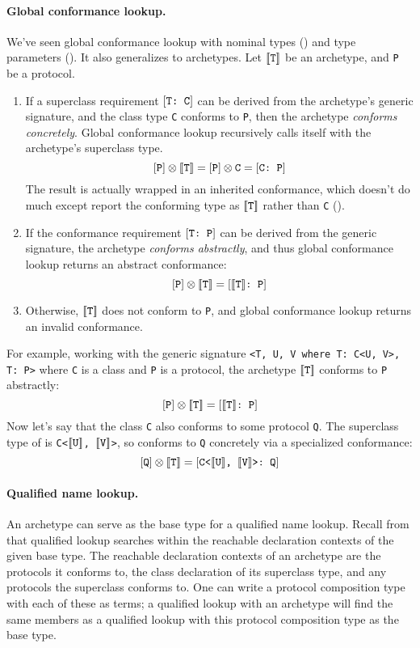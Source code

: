 \documentclass[../generics]{subfiles}
\begin{document}
\paragraph{Global conformance lookup.} We've seen global conformance lookup with nominal types () and type parameters (). It also generalizes to archetypes. Let $[\![\texttt{T}]\!]$ be an archetype, and \texttt{P} be a protocol.
\begin{enumerate}
\item If a superclass requirement $[\texttt{T:~C}]$ can be derived from the archetype's generic signature, and the class type \texttt{C} conforms to \texttt{P}, then the archetype \emph{conforms concretely}. Global conformance lookup recursively calls itself with the archetype's superclass type.
\[[\texttt{P}]\otimes[\![\texttt{T}]\!]=[\texttt{P}]\otimes\texttt{C}=[\texttt{C:~P}]\]
The result is actually wrapped in an inherited conformance, which doesn't do much except report the conforming type as $[\![\texttt{T}]\!]$ rather than \texttt{C} ().
\item If the conformance requirement $[\texttt{T:~P}]$ can be derived from the generic signature, the archetype \emph{conforms abstractly}, and thus global conformance lookup returns an abstract conformance:
\[[\texttt{P}]\otimes[\![\texttt{T}]\!]=[\texttt{$[\![\texttt{T}]\!]$:~P}]\]
\item Otherwise, $[\![\texttt{T}]\!]$ does not conform to \texttt{P}, and global conformance lookup returns an invalid conformance.
\end{enumerate}
For example, working with the generic signature \verb|<T, U, V where T: C<U, V>, T: P>| where \texttt{C} is a class and \texttt{P} is a protocol, the archetype $[\![\texttt{T}]\!]$ conforms to \texttt{P} abstractly:
\[
[\texttt{P}]\otimes [\![\texttt{T}]\!] = [\texttt{$[\![\texttt{T}]\!]$:~P}]
\]
Now let's say that the class \texttt{C} also conforms to some protocol \texttt{Q}. The superclass type of  is \texttt{C<$[\![\texttt{U}]\!]$, $[\![\texttt{V}]\!]$>}, so  conforms to \texttt{Q} concretely via a specialized conformance:
\[
[\texttt{Q}]\otimes [\![\texttt{T}]\!] = [\texttt{C<$[\![\texttt{U}]\!]$, $[\![\texttt{V}]\!]$>:~Q}]
\]

\paragraph{Qualified name lookup.} An archetype can serve as the base type for a qualified name lookup. Recall from  that qualified lookup searches within the reachable declaration contexts of the given base type. The reachable declaration contexts of an archetype are the protocols it conforms to, the class declaration of its superclass type, and any protocols the superclass conforms to. One can write a protocol composition type with each of these as terms; a qualified lookup with an archetype will find the same members as a qualified lookup with this protocol composition type as the base type.
\end{document}
